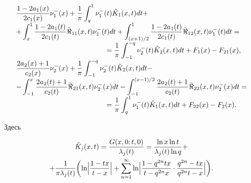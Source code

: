 \begin{equation}

\begin{array}{l}

\displaystyle

\frac{{1 - 2{a_1}(x)}}{{2{c_1}(x)}}\nu _1^ - (x) + \frac{1}{\pi } \int _q^1 {\nu _1^ - (t){{\tilde K}_1}(x,t)dt}  + 

\\

\displaystyle

+  \int _x^1 \frac{{1 - 2{a_1}(t)}}{{2{c_1}(t)}}{{\bar \Re }_{11}}(x,t)\nu _1^ - (t)dt +   \int _{({{x + 1}})/{2}}^1 {\frac{{1 - 2{a_1}(t)}}{{2{c_1}(t)}}{{\bar \Re }_{12}}(x,t)\nu _1^ - (t)dt} =

\\

\displaystyle \hspace{4.5cm}

  = \frac{1}{\pi } \int _{ - 1}^{ - q} {\nu _2^ - (t){{\tilde K}_2}(x,t)dt}  + {F_1}(x) - {F_{21}}(x),\\[2mm]

\displaystyle 

\frac{{2{a_2}(x) + 1}}{{{c_2}(x)}}\nu _2^ - (x) + \frac{1}{\pi } \int _{ - 1}^{ - q} {\nu _2^ - (t){{\tilde K}_2}(x,t)dt}  - 

\\

\displaystyle

-

 \int _{ - 1}^x \frac{{2{a_2}(t) + 1}}{{{c_2}(t)}}{{\bar \Re }_{21}}(x,t)\nu _2^ - (x)dt  -  \int _{ - 1}^{({{x - 1}})/{2}} {\frac{{2{a_2}(t) + 1}}{{{c_2}(t)}}{{\bar \Re }_{22}}(x,t)\nu _2^ - (x)dt} = 

\\ 

\displaystyle \hspace{4.5cm}

   = \frac{1}{\pi } \int _q^1 {\nu _1^ - (t){{\tilde K}_1}(x,t)dt}  + {F_{22}}(x) - {F_2}(x).

\end{array}

\label{eq:42}

\end{equation}



\newpage

\noindent

Здесь

\begin{multline}

{\tilde K_j}(x,t) = \frac{{G(x, 0;t, 0)}}{{{\lambda _j}(t)}} = \frac{{\ln x\ln t}}{{{\lambda _j}(t)\ln q}} +

\\

 + \frac{1}{{\pi {\lambda _j}(t)}}\biggl( {\ln \Bigl| {\frac{{1 - tx}}{{t - x}}} \Bigr| + \sum\limits_{n = 1}^\infty  {\ln \Bigl| {\frac{{1 - {q^{2n}}tx}}{{t - {q^{2n}}x}} \cdot \frac{{{q^{2n}} - tx}}{{{q^{2n}}t - x}}} \Bigr|} } \biggr).

\end{multline}



